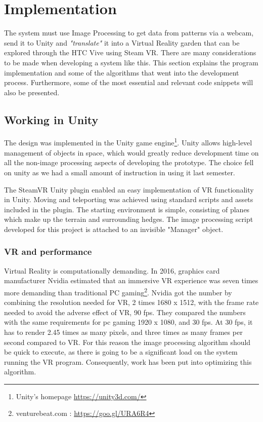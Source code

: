 \chapter{Implementation}
	The system must use Image Processing to get data from patterns via a webcam, send it to Unity and \textit{"translate"} it into a Virtual Reality garden that can be explored through the HTC Vive using Steam VR. There are many considerations to be made when developing a system like this. This section explains the program implementation and some of the algorithms that went into the development process. Furthermore, some of the most essential and relevant code snippets will also be presented.
	
	\section{Working in Unity}
The design was implemented in the Unity game engine\footnote{Unity's homepage \url{https://unity3d.com/}}. Unity allows high-level management of objects in space, which would greatly reduce development time on all the non-image processing aspects of developing the prototype. The choice fell on unity as we had a small amount of instruction in using it last semester.

The SteamVR Unity plugin enabled an easy implementation of VR functionality in Unity. Moving and teleporting was achieved using standard scripts and assets included in the plugin. 	
The starting environment is simple, consisting of planes which make up the terrain and surrounding hedges. The image processing script developed for this project is attached to an invisible "Manager" object.
	\subsection{VR and performance}

	Virtual Reality is computationally demanding. In 2016, graphics card manufacturer Nvidia estimated that an immersive VR experience was seven times more demanding than traditional PC gaming\footnote{venturebeat.com : \url{https://goo.gl/URA6R4}}. Nvidia got the number by combining the resolution needed for VR, 2 times 1680 x 1512, with the frame rate needed to avoid the adverse effect of VR, 90 fps. They compared the numbers with the same requirements for pc gaming 1920 x 1080, and 30 fps. At 30 fps, it has to render 2.45 times as many pixels, and three times as many frames per second compared to VR. For this reason the image processing algorithm should be quick to execute, as there is going to be a significant load on the system running the VR program. Consequently, work has been put into optimizing this algorithm.
